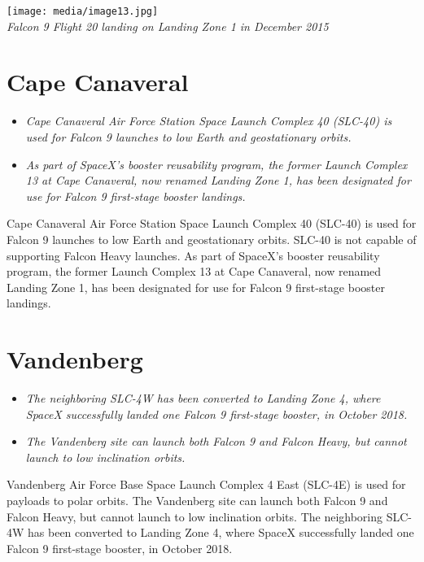 \texttt{[image: media/image13.jpg]}\\
\emph{Falcon 9 Flight 20 landing on Landing Zone 1 in December 2015}

\section{Cape Canaveral}\label{cape-canaveral}

\begin{itemize}
\item
  \emph{Cape Canaveral Air Force Station Space Launch Complex 40
  (SLC-40) is used for Falcon 9 launches to low Earth and geostationary
  orbits.}
\item
  \emph{As part of SpaceX's booster reusability program, the former
  Launch Complex 13 at Cape Canaveral, now renamed Landing Zone 1, has
  been designated for use for Falcon 9 first-stage booster landings.}
\end{itemize}

Cape Canaveral Air Force Station Space Launch Complex 40 (SLC-40) is
used for Falcon 9 launches to low Earth and geostationary orbits. SLC-40
is not capable of supporting Falcon Heavy launches. As part of SpaceX's
booster reusability program, the former Launch Complex 13 at Cape
Canaveral, now renamed Landing Zone 1, has been designated for use for
Falcon 9 first-stage booster landings.

\section{Vandenberg}\label{vandenberg}

\begin{itemize}
\item
  \emph{The neighboring SLC-4W has been converted to Landing Zone 4,
  where SpaceX successfully landed one Falcon 9 first-stage booster, in
  October 2018.}
\item
  \emph{The Vandenberg site can launch both Falcon 9 and Falcon Heavy,
  but cannot launch to low inclination orbits.}
\end{itemize}

Vandenberg Air Force Base Space Launch Complex 4 East (SLC-4E) is used
for payloads to polar orbits. The Vandenberg site can launch both Falcon
9 and Falcon Heavy, but cannot launch to low inclination orbits. The
neighboring SLC-4W has been converted to Landing Zone 4, where SpaceX
successfully landed one Falcon 9 first-stage booster, in October 2018.

